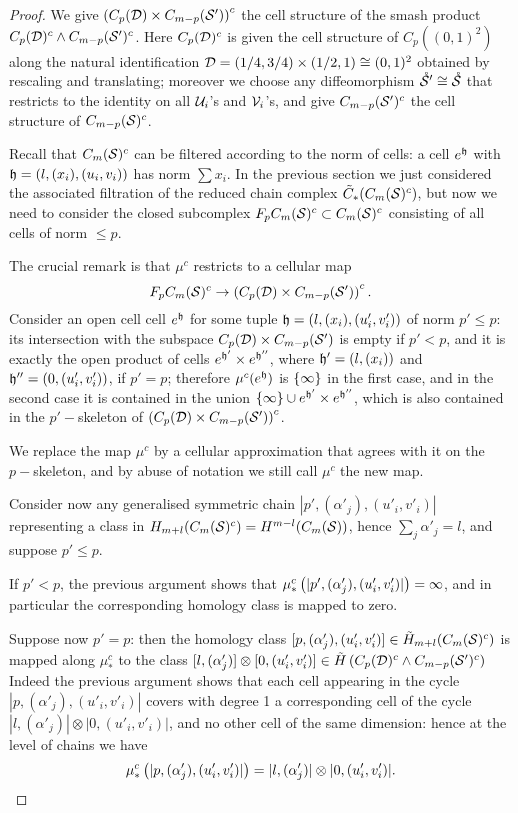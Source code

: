 \begin{proof}
We give $\pa{C_p(\D)\times C_{m-p}(\S')}^c$ the cell structure of the smash product
$C_p(\D)^c\wedge C_{m-p}(\S')^c$. Here $C_p(\D)^c$ is given the cell structure of $C_p((0,1)^2)$
along the natural identification $\D=(1/4,3/4)\times(1/2,1)\cong(0,1)^2$ obtained by rescaling
and translating; moreover we choose any diffeomorphism $\mrS'\cong\mrS$ that restricts to the identity
on all $\U_i$'s and $\V_i$'s, and give $C_{m-p}(\S')^c$ the cell structure of $C_{m-p}(\S)^c$.

Recall that $\cms^c$ can be filtered according to the norm of cells: a cell $e^{\tup}$ with
$\tup=(l,(x_i),(u_i,v_i))$ has norm $\sum x_i$. In the previous section we just considered
the associated filtration of the reduced chain complex $\tCh_*(\cms^c)$, but now we need
to consider the closed subcomplex $F_p\cms^c\subset\cms^c$ consisting of all cells of norm $\leq p$.

The crucial remark is that $\mu^c$ restricts to a cellular map 
\[
F_p\cms^c\to \pa{C_p(\D)\times C_{m-p}(\S')}^c.
\]
Consider an open cell
cell $e^{\tup}$ for some tuple $\tup=(l, (x_i),(u'_i,v'_i))$ of norm $p'\leq p$:
its intersection with the subspace
$C_p(\D)\times C_{m-p}(\S')$ is empty if $p'<p$, and it is exactly the open product of cells
$e^{\tup'}\times e^{\tup''}$,
where $\tup'=(l,(x_i))$ and $\tup''=(0,(u'_i,v'_i))$, if $p'=p$; therefore
$\mu^c(e^{\tup})$ is $\set{\infty}$ in the first case, and in the second case it
is contained in the union $\set{\infty}\cup e^{\tup'}\times e^{\tup''}$, which is also
contained in the $p'-$skeleton of $\pa{C_p(\D)\times C_{m-p}(\S')}^c$.

We replace the map $\mu^c$ by a cellular approximation that agrees with it on the $p-$skeleton,
and by abuse of notation we still call $\mu^c$ the new map.

Consider now any generalised symmetric chain $|p',(\alpha'_j),(u'_i,v'_i)|$ representing
a class in $H_{m+l}(\cms^c)=H^{m-l}(\cms)$, hence $\sum_j\alpha'_j=l$, and suppose $p'\leq p$.

If $p'<p$, the previous argument shows that $\mu^c_*\pa{|p',(\alpha'_j),(u'_i,v'_i)|}=\infty$,
and in particular the corresponding homology class is mapped to zero.

Suppose now $p'=p$: then the homology class $[p,(\alpha'_j),(u'_i,v'_i)]\in \tH_{m+l}(\cms^c)$
is mapped along $\mu^c_*$ to the class
$[l,(\alpha'_j)]\otimes [0,(u'_i,v'_i)]\in\tH\pa{C_p(\D)^c\wedge C_{m-p}(\S')^c}$
Indeed the previous
argument shows that each cell appearing in the cycle $|p,(\alpha'_j),(u'_i,v'_i)|$ covers with degree
1 a corresponding cell of the cycle $|l,(\alpha'_j)|\otimes |0,(u'_i,v'_i)|$, and no other cell
of the same dimension: hence at the level of chains we have 
\[
\mu^c_*\pa{|p,(\alpha'_j),(u'_i,v'_i)|}=|l,(\alpha'_j)|\otimes |0,(u'_i,v'_i)|.
\]


\end{proof}
